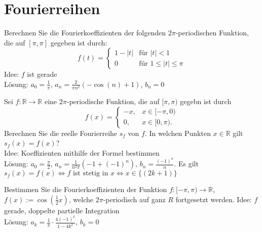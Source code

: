 \section{Fourierreihen}
Berechnen Sie die Fourierkoeffizienten der folgenden $2\pi$-periodischen Funktion, die auf $[\pi, \pi]$ gegeben ist durch:
\begin{displaymath}
  f(t) =
  \begin{cases}
    1 - |t|& \text{für } |t| < 1\\
    0& \text{für } 1 \leq |t| \leq \pi
  \end{cases}
\end{displaymath}
Idee: $f$ ist gerade\\
Lösung: $a_0 = \frac{1}{\pi}$, $a_n = \frac{2}{\pi n^2}(-\cos(n) + 1)$, $b_n = 0$

Sei $f : \mathbb{R} \to \mathbb{R}$ eine $2\pi$-periodische Funktion, die auf $[\pi, \pi)$ gegebn ist durch
\begin{displaymath}
  f(x) =
  \begin{cases}
    -x,& x \in [-\pi,0)\\
    0,& x \in [0,\pi).
  \end{cases}
\end{displaymath}
Berechnen Sie die reelle Fourierreihe $s_f$ von $f$.
In welchen Punkten $x \in \mathbb{R}$ gilt $s_f(x) = f(x)$?\\
Idee: Koeffizienten mithilfe der Formel bestimmen\\
Lösung: $a_0 = \frac{\pi}{2}$, $a_n = \frac{1}{n^2 \pi}(-1 + (-1)^n)$, $b_n = \frac{(-1)^n}{n}$.
Es gilt $s_f(x) = f(x) \iff f \text{ ist stetig in } x \iff x \in \{(2k+1)\}$

Bestimmen Sie die Fourierkoeffizienten der Funktion $f : [-\pi, \pi) \to \mathbb{R}$, $f(x) := \cos\left(\frac{1}{2}x\right)$, welche $2\pi$-periodisch auf ganz $R$ fortgesetzt werden.
Idee: $f$ gerade, doppelte partielle Integration\\
Lösung: $a_k = \frac{1}{\pi} \cdot \frac{4(-1)^k}{1-4k^2}$, $b_k = 0$